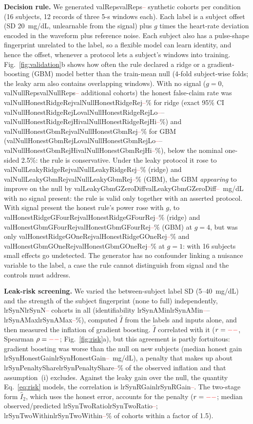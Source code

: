 \documentclass[journal]{IEEEtran}
\newcommand{\m}[1]{\ifcsname #1\endcsname\csname #1\endcsname\else\textcolor{red}{--}\fi}
\begin{document}
\textbf{Decision rule.}  We generated \m{valReps} synthetic cohorts per
condition (16 subjects, 12 records of three 5-s windows each).  Each label is
a subject offset (SD 20~mg/dL, unlearnable from the signal) plus $g$ times
the heart-rate deviation encoded in the waveform plus reference noise.  Each
subject also has a pulse-shape fingerprint unrelated to the label, so a
flexible model can learn identity, and hence the offset, whenever a protocol
lets a subject's windows into training.  Fig.~\ref{fig:validation}b shows how
often the rule declared a ridge or a gradient-boosting (GBM) model better
than the train-mean null (4-fold subject-wise folds; the leaky arm also
contains overlapping windows).  With no signal ($g=0$, \m{valNullReps}
additional cohorts) the honest false-claim rate was \m{valNullHonestRidgeRej}\%
for ridge (exact 95\% CI \m{valNullHonestRidgeRejLo}--\m{valNullHonestRidgeRejHi}\%)
and \m{valNullHonestGbmRej}\% for GBM (\m{valNullHonestGbmRejLo}--\m{valNullHonestGbmRejHi}\%),
below the nominal one-sided 2.5\%: the rule is conservative.  Under the leaky protocol it
rose to \m{valNullLeakyRidgeRej}\% (ridge) and \m{valNullLeakyGbmRej}\% (GBM), the
GBM \emph{appearing} to improve on the null by \m{valLeakyGbmGZeroDiff}~mg/dL
with no signal present: the rule is valid only together with an asserted
protocol.  With signal present the honest rule's power rose with $g$, to
\m{valHonestRidgeGFourRej}\% (ridge) and \m{valHonestGbmGFourRej}\% (GBM) at
$g=4$, but was only \m{valHonestRidgeGOneRej}\% and \m{valHonestGbmGOneRej}\% at
$g=1$: with 16 subjects small effects go undetected.  The generator has no
confounder linking a nuisance variable to the label, a case the rule cannot
distinguish from signal and the controls must address.

\textbf{Leak-risk screening.}  We varied the between-subject label SD
(5--40~mg/dL) and the strength of the subject fingerprint (none to full)
independently, \m{lrSynN} cohorts in all (identifiability \m{lrSynAMin}--\m{lrSynAMax}\%),
computed $\hat{I}$ from the labels and inputs alone, and then measured the
inflation of gradient boosting.  $\hat{I}$ correlated with it ($r=\m{lrSynR}$,
Spearman $\rho=\m{lrSynRho}$; Fig.~\ref{fig:risk}a), but this agreement is
partly fortuitous: gradient boosting was worse than the null on new subjects
(median honest gain \m{lrSynHonestGain}~mg/dL), a penalty that makes up about
\m{lrSynPenaltyShare}\% of the observed inflation and that assumption~(i)
excludes.  Against the leaky gain over the null, the quantity
Eq.~\eqref{eq:risk} models, the correlation is \m{lrSynRGain}.  The two-stage
form $\hat{I}_2$, which uses the honest error, accounts for the penalty
($r=\m{lrSynTwoR}$; median observed/predicted \m{lrSynTwoRatio}; \m{lrSynTwoWithin}\%
of cohorts within a factor of 1.5).
\end{document}
